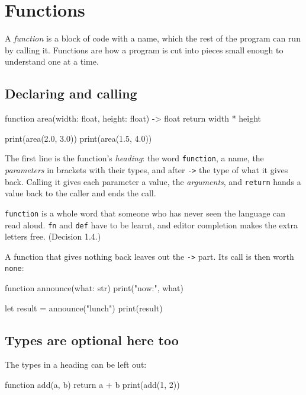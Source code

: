 \chapter{Functions}\label{ch-functions}

A \emph{function} is a block of code with a name, which the rest of
the program can run by calling it. Functions are how a program is cut
into pieces small enough to understand one at a time.

\section{Declaring and calling}

\begin{zeno}
function area(width: float, height: float) -> float {
    return width * height
}

print(area(2.0, 3.0))
print(area(1.5, 4.0))
\end{zeno}

The first line is the function's \emph{heading}: the word
\verb|function|, a name, the \emph{parameters} in brackets with their
types, and after \verb|->| the type of what it gives back. Calling it
gives each parameter a value, the \emph{arguments}, and
\verb|return| hands a value back to the caller and ends the call.

\begin{why}
\verb|function| is a whole word that someone who has never seen the
language can read aloud. \verb|fn| and \verb|def| have to be learnt,
and editor completion makes the extra letters free. (Decision 1.4.)
\end{why}

A function that gives nothing back leaves out the \verb|->| part. Its
call is then worth \verb|none|:

\begin{zeno}
function announce(what: str) {
    print("now:", what)
}

let result = announce("lunch")
print(result)
\end{zeno}

\section{Types are optional here too}

The types in a heading can be left out:

\begin{zeno}
function add(a, b) {
    return a + b
}
print(add(1, 2))
\end{zeno}

